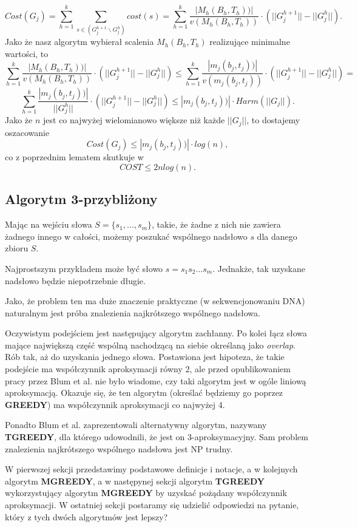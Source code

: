 $$Cost(G_j) = \sum_{h=1}^{k} \sum_{s \in (G_j^{h+1} \backslash G_j^{h})} cost(s) = \sum_{h=1}^{k} \frac{|M_h(B_h, T_h))|}{v(M_h(B_h, T_h))} \cdot (||G_j^{h+1}|| - ||G_j^{h}||).$$
Jako że nasz algorytm wybierał scalenia $M_h(B_h, T_h)$ realizujące minimalne wartości, to
$$\sum_{h=1}^{k} \frac{|M_h(B_h, T_h))|}{v(M_h(B_h, T_h))} \cdot (||G_j^{h+1}|| - ||G_j^{h}||) \leq \sum_{h=1}^{k} \frac{|m_j(b_j, t_j))|}{v(m_j(b_j, t_j))} \cdot (||G_j^{h+1}|| - ||G_j^{h}||) = $$
$$\sum_{h=1}^{k} \frac{|m_j(b_j, t_j))|}{||G_j^{h}||} \cdot (||G_j^{h+1}|| - ||G_j^{h}||) \leq |m_j(b_j, t_j))| \cdot Harm(||G_j||).$$
Jako że $n$ jest co najwyżej wielomianowo większe niż każde $||G_j||$, to dostajemy oszacowanie
$$Cost(G_j) \leq |m_j(b_j, t_j))| \cdot log(n),$$
co z poprzednim lematem skutkuje w
$$COST \leq 2nlog(n).$$



\subsection{Algorytm 3-przybliżony}

Mając na wejściu słowa $S = \{s_1,...,s_m\}$, takie, że żadne z nich nie zawiera żadnego innego w całości, możemy poszukać wspólnego nadsłowo $s$ dla danego zbioru $S$.

Najprostszym przykładem może być słowo $s=s_1s_2...s_m$. Jednakże, tak uzyskane nadsłowo będzie niepotrzebnie długie.

Jako, że problem ten ma duże znaczenie praktyczne (w sekwencjonowaniu DNA) naturalnym jest próba znalezienia najkrótszego wspólnego nadsłowa.

Oczywistym podejściem jest następujący algorytm zachłanny. Po kolei łącz słowa mające największą część wspólną nachodzącą na siebie określaną jako \textit{overlap}. Rób tak, aż do uzyskania 
jednego słowa. Postawiona jest hipoteza, że takie podejście ma współczynnik aproksymacji równy 2, ale przed opublikowaniem pracy przez Blum et al. nie było wiadome, czy taki algorytm jest w ogóle liniową aproksymacją. Okazuje się, że ten algorytm (określać będziemy go poprzez \textbf{GREEDY}) ma współczynnik aproksymacji co najwyżej 4.

Ponadto Blum et al. zaprezentowali alternatywny algorytm, nazywany \textbf{TGREEDY}, dla którego udowodnili, że jest on 3-aproksymacyjny. Sam problem znalezienia najkrótszego wspólnego nadsłowa jest NP trudny.

W pierwszej sekcji przedstawimy podstawowe definicje i notacje, a w kolejnych algorytm \textbf{MGREEDY}, a w następynej sekcji algorytm 
\textbf{TGREEDY} wykorzystujący algorytm \textbf{MGREEDY} by uzyskać pożądany współczynnik aproksymacji. W ostatniej sekcji postaramy się udzielić odpowiedzi na pytanie, który z tych dwóch algorytmów jest lepszy? \pagebreak
